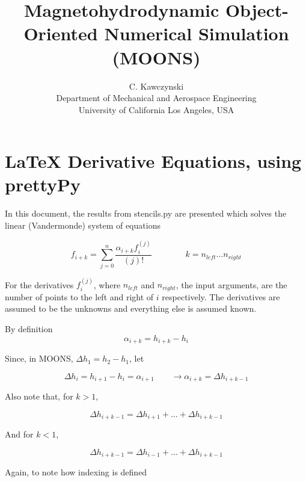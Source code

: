 \documentclass[11pt]{article}
\begin{document}
\doublespacing
\title{Magnetohydrodynamic Object-Oriented Numerical Simulation (MOONS)}
\author{C. Kawczynski \\
Department of Mechanical and Aerospace Engineering \\
University of California Los Angeles, USA\\}
\maketitle
\section{LaTeX Derivative Equations, using prettyPy}

In this document, the results from stencils.py are presented which solves the linear (Vandermonde) system of equations

\begin{equation}
	f_{i+k}
	=
	\sum_{j=0}^n
	\frac{\alpha_{i+k} f_{i}^{(j)}}{(j)!}
	\qquad \qquad
	k = n_{left} \dots n_{right}
\end{equation}

For the derivatives $f_i^{(j)}$, where $n_{left}$ and $n_{right}$, the input arguments, are the number of points to the left and right of $i$ respectively. The derivatives are assumed to be the unknowns and everything else is assumed known.

By definition
\begin{equation}
	\alpha_{i+k} 
	=
	h_{i+k} - h_{i}
\end{equation}

Since, in MOONS, $\Delta h_1 = h_2 - h_1$, let

\begin{equation}
	\Delta h_{i}
	=
	h_{i+1} - h_{i}
	=
	\alpha_{i+1}
	\qquad
	\rightarrow
	\alpha_{i+k} = \Delta h_{i+k-1}
\end{equation}

Also note that, for $k>1$,

\begin{equation}
	\Delta h_{i+k-1}
	=
	\Delta h_{i+1}
	+
	\dots
	+
	\Delta h_{i+k-1}
\end{equation}

And for $k<1$,

\begin{equation}
	\Delta h_{i+k-1}
	=
	\Delta h_{i-1}
	+
	\dots
	+
	\Delta h_{i+k-1}
\end{equation}

Again, to note how indexing is defined
\end{document}
